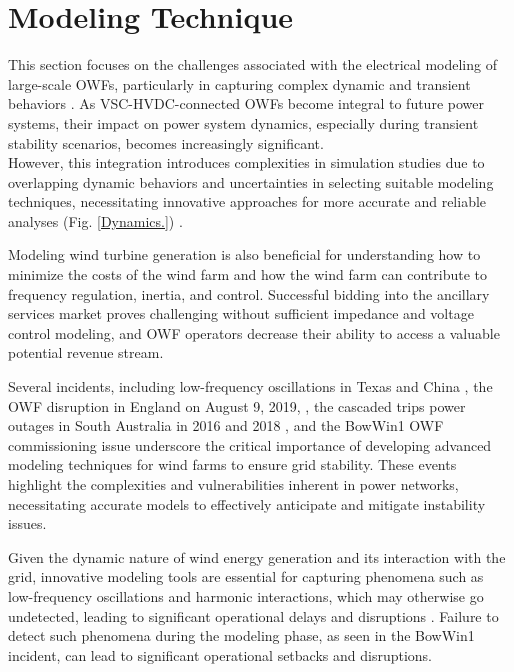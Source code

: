 \documentclass{ieeeaccess}
\begin{document}
\section{\textbf{Modeling Technique}}
This section focuses on the challenges associated with the electrical modeling of large-scale OWFs, particularly in capturing complex dynamic and transient behaviors \cite{otter2022review}. As VSC-HVDC-connected OWFs become integral to future power systems, their impact on power system dynamics, especially during transient stability scenarios, becomes increasingly significant. \\However, this integration introduces complexities in simulation studies due to overlapping dynamic behaviors and uncertainties in selecting suitable modeling techniques, necessitating innovative approaches for more accurate and reliable analyses (Fig. \ref{Dynamics.}) \cite{van2015effect, tahaguas2023modeling}.


Modeling wind turbine generation is also beneficial for understanding how to minimize the costs of the wind farm and how the wind farm can contribute to frequency regulation, inertia, and control. Successful bidding into the ancillary services market proves challenging without sufficient impedance and voltage control modeling, and OWF operators decrease their ability to access a valuable potential revenue stream.

Several incidents, including low-frequency oscillations in Texas and China \cite{fan2018wind}, the OWF disruption in England on August 9, 2019, \cite{bialek2020does}, the cascaded trips power outages in South Australia in 2016 and 2018 \cite{operator2019final}, and the BowWin1 OWF commissioning issue \cite{buchhagen2015borwin1} underscore the critical importance of developing advanced modeling techniques for wind farms to ensure grid stability. These events highlight the complexities and vulnerabilities inherent in power networks, necessitating accurate models to effectively anticipate and mitigate instability issues. 

Given the dynamic nature of wind energy generation and its interaction with the grid, innovative modeling tools are essential for capturing phenomena such as low-frequency oscillations and harmonic interactions, which may otherwise go undetected, leading to significant operational delays and disruptions \cite{cheah2023modeling}. Failure to detect such phenomena during the modeling phase, as seen in the BowWin1 incident, can lead to significant operational setbacks and disruptions.
\end{document}
